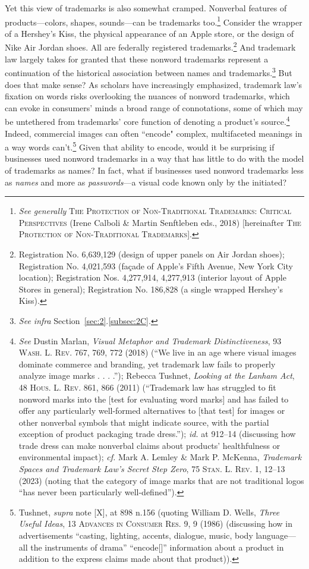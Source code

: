 \documentclass[letterpaper, 11pt, oneside]{article}
\begin{document}
Yet this view of trademarks is also somewhat cramped. Nonverbal features of products—colors, shapes, sounds—can be trademarks too.\footnote{\textit{See generally} \textsc{The Protection of Non-Traditional Trademarks: Critical Perspectives} (Irene Calboli \& Martin Senftleben eds., 2018) [hereinafter \textsc{The Protection of Non-Traditional Trademarks}].} Consider the wrapper of a Hershey’s Kiss, the physical appearance of an Apple store, or the design of Nike Air Jordan shoes. All are federally registered trademarks.\footnote{Registration No. 6,639,129 (design of upper panels on Air Jordan shoes); Registration No. 4,021,593 (façade of Apple's Fifth Avenue, New York City location); Registration Nos. 4,277,914, 4,277,913 (interior layout of Apple Stores in general); Registration No. 186,828 (a single wrapped Hershey's Kiss).} And trademark law largely takes for granted that these nonword trademarks represent a continuation of the historical association between names and trademarks.\footnote{\textit{See infra} Section~\ref{sec:2}.\ref{subsec:2C}.} But does that make sense? As scholars have increasingly emphasized, trademark law's fixation on words risks overlooking the nuances of nonword trademarks, which can evoke in consumers' minds a broad range of connotations, some of which may be untethered from trademarks' core function of denoting a product's source.\footnote{\label{supra3} \textit{See} Dustin Marlan, \textit{Visual Metaphor and Trademark Distinctiveness}, 93 \textsc{Wash. L. Rev.} 767, 769, 772 (2018) (``We live in an age where visual images dominate commerce and branding, yet trademark law fails to properly analyze image marks . . . .''); Rebecca Tushnet, \textit{Looking at the Lanham Act}, 48 \textsc{Hous. L. Rev.} 861, 866 (2011) (``Trademark law has struggled to fit nonword marks into the [test for evaluating word marks] and has failed to offer any particularly well-formed alternatives to [that test] for images or other nonverbal symbols that might indicate source, with the partial exception of product packaging trade dress.''); \textit{id.} at 912–14 (discussing how trade dress can make nonverbal claims about products' healthfulness or environmental impact); \textit{cf.} Mark A. Lemley \& Mark P. McKenna, \textit{Trademark Spaces and Trademark Law’s Secret Step Zero}, 75 \textsc{Stan. L. Rev.} 1, 12–13 (2023) (noting that the category of image marks that are not traditional logos ``has never been particularly well-defined'').} Indeed, commercial images can often ``encode" complex, multifaceted meanings in a way words can't.\footnote{Tushnet, \textit{supra} note [X], at 898 n.156 (quoting William D. Wells, \textit{Three Useful Ideas}, 13 \textsc{Advances in Consumer Res.} 9, 9 (1986) (discussing how in advertisements ``casting, lighting, accents, dialogue, music, body language—all the instruments of drama'' ``encode[]'' information about a product in addition to the express claims made about that product)).} Given that ability to encode, would it be surprising if businesses used nonword trademarks in a way that has little to do with the model of trademarks as names? In fact, what if businesses used nonword trademarks less as \textit{names} and more as \textit{passwords}—a visual code known only by the initiated?
\end{document}
